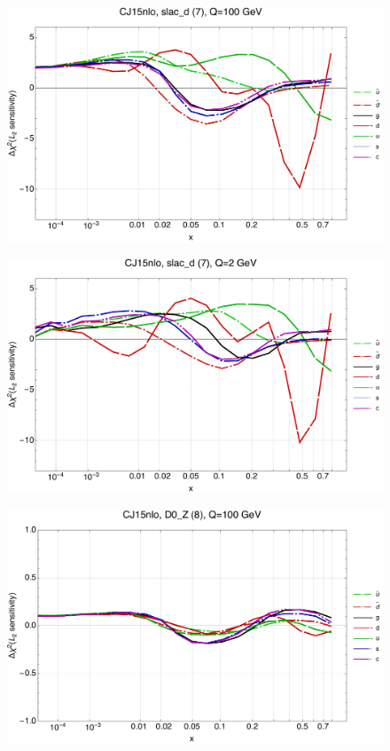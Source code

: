 \documentclass[10pt,aps,prd,floatfix,titlepage]{revtex4}
\begin{document}
\clearpage
\begin{figure}
\includegraphics[width=\textwidth,height=0.44\textheight,keepaspectratio]{1/7_CJ15nlo_L2_q100_Sf_1.pdf}
\caption{}
\end{figure}
\begin{figure}
\includegraphics[width=\textwidth,height=0.44\textheight,keepaspectratio]{1/7_CJ15nlo_L2_q2_Sf_1.pdf}
\caption{}
\end{figure}
\clearpage
\begin{figure}
\includegraphics[width=\textwidth,height=0.44\textheight,keepaspectratio]{1/8_CJ15nlo_L2_q100_Sf_1.pdf}
\caption{}
\end{figure}
\end{document}
